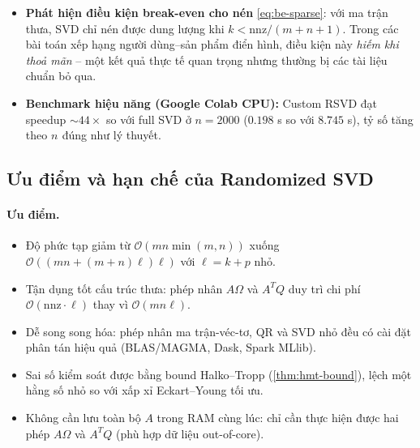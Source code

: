 \begin{itemize}
\begin{itemize}
        \item Ma trận rating thưa (\cref{subsec:exp-movielens}): kích thước
        $\mlM \times \mlN$, $\mathrm{nnz} = \mlNNZ$, mật độ \mlDensity.
        Biểu diễn nén \emph{lớn hơn} CSR gốc $31.7\times$--$41.0\times$ tuỳ
        $\eta$, do $k^\star \gg k_{be}^{\text{thưa}} = \mlKbe$. Ngưỡng
        $\eta = 0.99$ thậm chí không đạt được với $k_{\max} = 1500$.
    \end{itemize}

    \item \textbf{Phát hiện điều kiện break-even cho nén}
    \eqref{eq:be-sparse}: với ma trận thưa, SVD chỉ nén được dung lượng khi
    $k < \mathrm{nnz}/(m+n+1)$. Trong các bài toán xếp hạng người dùng--sản
    phẩm điển hình, điều kiện này \emph{hiếm khi thoả mãn} -- một kết quả
    thực tế quan trọng nhưng thường bị các tài liệu chuẩn bỏ qua.

    \item \textbf{Benchmark hiệu năng (Google Colab CPU):} Custom RSVD đạt
    speedup $\sim 44\times$ so với full SVD ở $n = 2000$ ($0.198$ s so với
    $8.745$ s), tỷ số tăng theo $n^{} $ đúng như lý thuyết.
\end{itemize}

\subsection{Ưu điểm và hạn chế của Randomized SVD}\label{subsec:pros-cons}

\paragraph{Ưu điểm.}
\begin{itemize}
    \item Độ phức tạp giảm từ $\mathcal{O}(mn\min(m,n))$ xuống
    $\mathcal{O}((mn + (m+n)\ell)\ell)$ với $\ell = k+p$ nhỏ.
    \item Tận dụng tốt cấu trúc thưa: phép nhân $A\Omega$ và $A^T Q$ duy trì
    chi phí $\mathcal{O}(\mathrm{nnz}\cdot \ell)$ thay vì $\mathcal{O}(mn\ell)$.
    \item Dễ song song hóa: phép nhân ma trận-véc-tơ, QR và SVD nhỏ đều có
    cài đặt phân tán hiệu quả (BLAS/MAGMA, Dask, Spark MLlib).
    \item Sai số kiểm soát được bằng bound Halko--Tropp (\cref{thm:hmt-bound}),
    lệch một hằng số nhỏ so với xấp xỉ Eckart--Young tối ưu.
    \item Không cần lưu toàn bộ $A$ trong RAM cùng lúc: chỉ cần thực hiện
    được hai phép $A\Omega$ và $A^T Q$ (phù hợp dữ liệu out-of-core).
\end{itemize}

